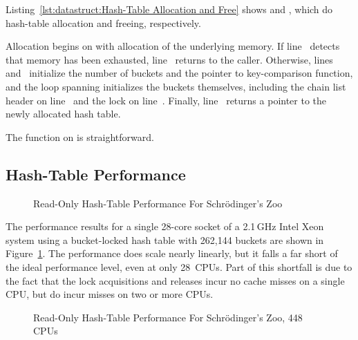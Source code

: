 Listing~\ref{lst:datastruct:Hash-Table Allocation and Free}
shows  and ,
which do hash-table allocation and freeing, respectively.
\begin{fcvref}
Allocation begins on
 with allocation of the underlying memory.
If line~ detects that memory has been exhausted,
line~ returns
 to the caller.
Otherwise, lines~ and~ initialize
the number of buckets and the pointer to key-comparison function,
and the loop
spanning  initializes the buckets themselves,
including the chain list header on
line~ and the lock on line~.
Finally, line~ returns a pointer to the newly allocated hash table.
\end{fcvref}
\begin{fcvref}
The  function on
 is straightforward.
\end{fcvref}

\subsection{Hash-Table Performance}
\label{sec:datastruct:Hash-Table Performance}

\begin{figure}
\centering
{}
\caption{Read-Only Hash-Table Performance For Schr\"odinger's Zoo}
\label{fig:datastruct:Read-Only Hash-Table Performance For Schroedinger's Zoo}
\end{figure}

The performance results for a single 28-core socket of a 2.1\,GHz
Intel Xeon system using a bucket-locked hash table
with 262,144 buckets are shown in
Figure~\ref{fig:datastruct:Read-Only Hash-Table Performance For Schroedinger's Zoo}.
The performance does scale nearly linearly, but it falls a far short
of the ideal performance level, even at only 28~CPUs.
Part of this shortfall is due to the fact that the lock acquisitions and
releases incur no cache misses on a single CPU, but do incur misses
on two or more CPUs.

\begin{figure}
\centering
{}
\caption{Read-Only Hash-Table Performance For Schr\"odinger's Zoo, 448 CPUs}
\label{fig:datastruct:Read-Only Hash-Table Performance For Schroedinger's Zoo; 448 CPUs}
\end{figure}

